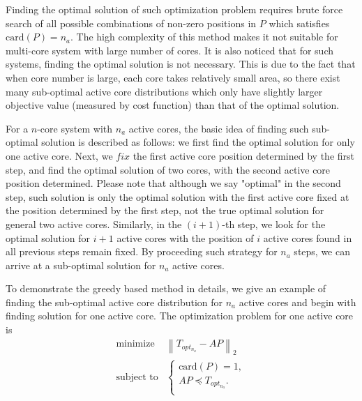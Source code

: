 Finding the optimal solution of such optimization problem requires brute force search of all possible combinations of non-zero positions in $P$ which satisfies $\text{card}(P)=n_{a}$. The high complexity of this method makes it not suitable for multi-core system with large number of cores. It is also noticed that for such systems, finding the optimal solution is not necessary. This is due to the fact that when core number is large, each core takes relatively small area, so there exist many sub-optimal active core distributions which only have slightly larger objective value (measured by cost function) than that of the optimal solution. 

For a $n$-core system with $n_{a}$ active cores, the basic idea of finding such sub-optimal solution is described as follows: we first find the optimal solution for only one active core. Next, we $fix$ the first active core position determined by the first step, and find the optimal solution of two cores, with the second active core position determined. Please note that although we say "optimal" in the second step, such solution is only the optimal solution with the first active core fixed at the position determined by the first step, not the true optimal solution for general two active cores. Similarly, in the $(i+1)$-th step, we look for the optimal solution for $i+1$ active cores with the position of $i$ active cores found in all previous steps remain fixed. By proceeding such strategy for $n_{a}$ steps, we can arrive at a sub-optimal solution for $n_{a}$ active cores.


To demonstrate the greedy based method in details, we give an example of finding the sub-optimal active core distribution for $n_{a}$ active cores and begin with finding solution for one active core. The optimization problem for one active core is
\begin{equation}\label{eq:1_sim_opt_topt}
\begin{split}
\text{minimize } &  \left \| T_{opt_{n_{a}}} - AP \right \|_{2}\\
\text{subject to} &\left\{
\begin{array}{lr}
\text{card}(P) = 1,\\
AP \preceq T_{opt_{n_{a}}}.\\
\end{array}
\right.
\end{split}
\end{equation}


